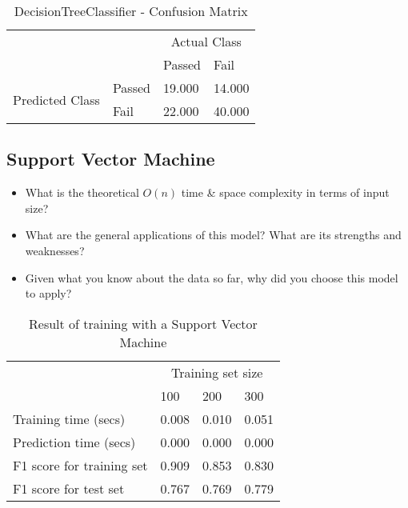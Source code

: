 \documentclass[12pt]{article}
\begin{document}
\setlength{\extrarowheight}{1.5pt}
\begin{table}[!htbp]
\caption{DecisionTreeClassifier - Confusion Matrix} %
\centering %
\begin{tabular}{ |l|l|p{3cm}|p{3cm}| }
\hline %
\multirow{2}{*}{} & & \multicolumn{2}{c|}{Actual Class} \\ 
\cline{3-4}
\multirow{2}{*}{} & & Passed & Fail \\ 
\hline
\multirow{2}{1.5in}{Predicted Class} & Passed & 19.000 & 14.000 \\ 
 & Fail & 22.000 & 40.000  \\ \hline
\end{tabular}
\end{table}



\subsection*{Support Vector Machine}
\begin{itemize} [noitemsep,nolistsep]
\item What is the theoretical $O(n)$ time \& space complexity in terms of input size?
\item What are the general applications of this model? What are its strengths and weaknesses?
\item Given what you know about the data so far, why did you choose this model to apply?
\end{itemize} 


\setlength{\extrarowheight}{1.5pt}
\begin{table}[!htbp]
\caption{Result of training with a Support Vector Machine} %
\centering %
\begin{tabular}{|p{6cm}|p{1.5cm}|p{1.5cm}|p{1.5cm}|} %
\hline %
& \multicolumn{3}{c|}{Training set size}\\[5pt]
\cline{2-4} 
& 100 & 200 & 300\\[0.5ex]
\hline %

Training time (secs)   &       0.008 & 0.010 & 0.051 \\
Prediction time (secs)   &     0.000 & 0.000 & 0.000 \\
F1 score for training set  &   0.909 & 0.853 & 0.830 \\
F1 score for test set    &     0.767 & 0.769 & 0.779 \\
\hline %
\end{tabular}
\label{svmTable}
\end{table}
\end{document}
